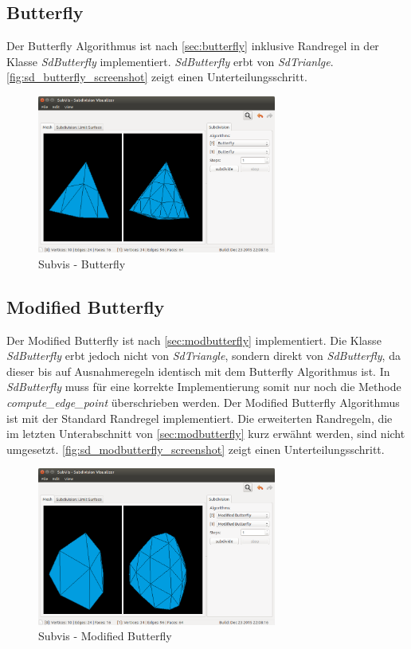 \subsection{Butterfly}

Der Butterfly Algorithmus ist nach \autoref{sec:butterfly}
inklusive Randregel in der Klasse \emph{SdButterfly} implementiert.
\emph{SdButterfly} erbt von \emph{SdTrianlge}.
\autoref{fig:sd_butterfly_screenshot} zeigt einen Unterteilungsschritt.

\begin{figure}
  \centering
  \includegraphics[width=0.7\textwidth]{content/media/sd_butterfly_screenshot.png}
  \caption{Subvis - Butterfly}
  \label{fig:sd_butterfly_screenshot}
\end{figure}

\subsection{Modified Butterfly}

Der Modified Butterfly ist nach \autoref{sec:modbutterfly} implementiert.
Die Klasse \emph{SdButterfly} erbt jedoch nicht von \emph{SdTriangle},
sondern direkt von \emph{SdButterfly}, da dieser bis auf Ausnahmeregeln
identisch mit dem Butterfly Algorithmus ist. In \emph{SdButterfly}
muss für eine korrekte Implementierung somit nur noch die Methode
\emph{compute\_edge\_point} überschrieben werden.
Der Modified Butterfly Algorithmus ist mit der Standard Randregel
implementiert.
Die erweiterten Randregeln, die im letzten Unterabschnitt von \autoref{sec:modbutterfly}
kurz erwähnt werden, sind nicht umgesetzt.
\autoref{fig:sd_modbutterfly_screenshot} zeigt einen Unterteilungsschritt.

\begin{figure}
  \centering
  \includegraphics[width=0.7\textwidth]{content/media/sd_modbutterfly_screenshot.png}
  \caption{Subvis - Modified Butterfly}
  \label{fig:sd_modbutterfly_screenshot}
\end{figure}














